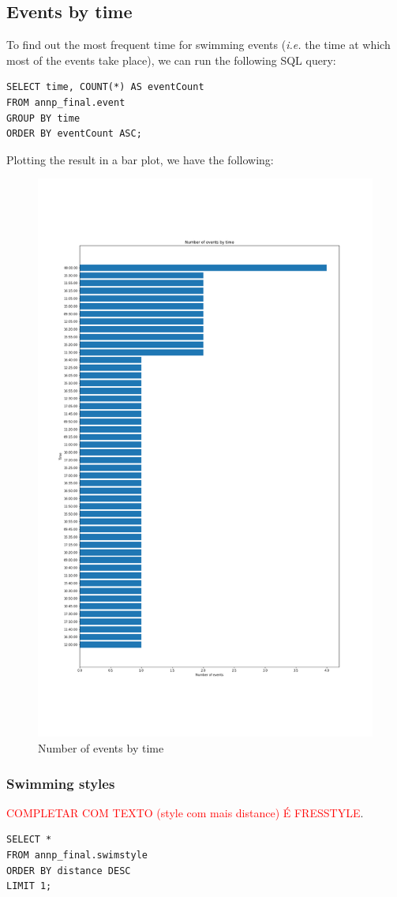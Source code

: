\subsection{Events by time}

To find out the most frequent time for swimming events (\textit{i.e.} the time at which most of the events take place),
we can run the following SQL query:

\begin{verbatim}
SELECT time, COUNT(*) AS eventCount
FROM annp_final.event
GROUP BY time
ORDER BY eventCount ASC;
\end{verbatim}

Plotting the result in a bar plot, we have the following:

\begin{figure}[H]
    \centering
    \includegraphics[width=.5\textwidth]{img/eventsbytime}
    \caption{Number of events by time}
    \label{fig:events-by-time}
\end{figure}

\subsubsection{Swimming styles}

\textcolor{red}{COMPLETAR COM TEXTO (style com mais distance) É FRESSTYLE}.

\begin{verbatim}
SELECT *
FROM annp_final.swimstyle
ORDER BY distance DESC
LIMIT 1;
\end{verbatim}

